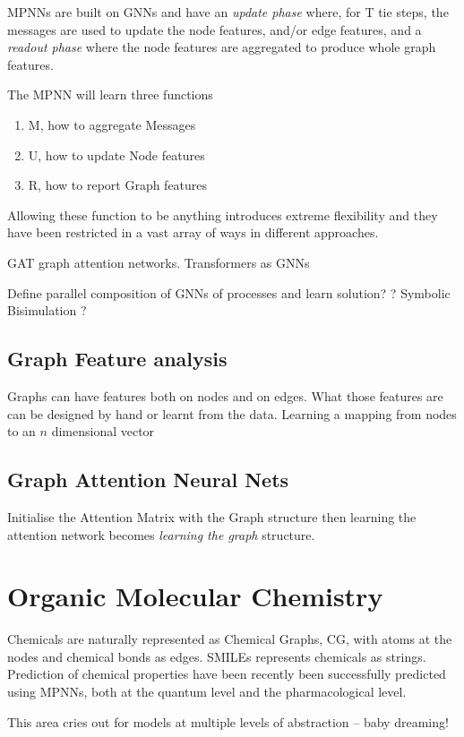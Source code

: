 MPNNs are built on GNNs and have an \emph{update phase} where, for T tie steps, the messages are used to update the node features, and/or edge features, and a \emph{readout phase} where the node features are aggregated to produce whole graph features. 

The MPNN will learn three functions 
\begin{enumerate}
\item M, how to aggregate Messages
\item U, how to update Node features
\item R, how to report Graph features
\end{enumerate}   
Allowing these function to be anything introduces extreme flexibility and they have been restricted in a vast array of ways in different approaches.





GAT graph attention networks.
Transformers as GNNs

Define parallel composition of GNNs of processes and learn solution?
? Symbolic Bisimulation ?

\subsection{Graph Feature analysis}
Graphs can have features both on nodes and on edges. What those features are can be designed by hand or learnt from the data.  Learning a mapping from nodes to an $n$ dimensional vector

\subsection{Graph Attention Neural Nets}
Initialise the Attention Matrix with  the Graph structure then learning the attention network becomes  \emph{learning the graph} structure.



\section{Organic Molecular Chemistry}
Chemicals are naturally represented as Chemical Graphs, CG, with atoms at the nodes and chemical bonds as edges.  SMILEs represents chemicals as strings.  Prediction of chemical properties have been recently been successfully predicted using MPNNs, both at the quantum level and the pharmacological level.

This area cries out for models at multiple levels of abstraction  -- baby dreaming!


